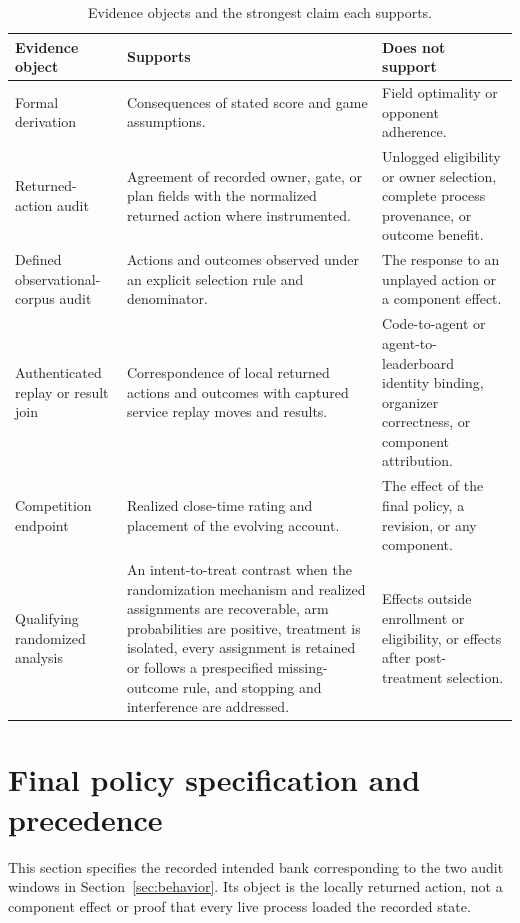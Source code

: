 \begin{table}[H]
\centering
\small
\caption{Evidence objects and the strongest claim each supports.}
\label{tab:evidence-status}
\begin{tabularx}{\linewidth}{@{}>{\raggedright\arraybackslash}p{2.85cm}YY@{}}
\toprule
Evidence object & Supports & Does not support \\
\midrule
Formal derivation & Consequences of stated score and game assumptions. & Field optimality or opponent adherence. \\
Returned-action audit & Agreement of recorded owner, gate, or plan fields with the normalized returned action where instrumented. & Unlogged eligibility or owner selection, complete process provenance, or outcome benefit. \\
Defined observational-corpus audit & Actions and outcomes observed under an explicit selection rule and denominator. & The response to an unplayed action or a component effect. \\
Authenticated replay or result join & Correspondence of local returned actions and outcomes with captured service replay moves and results. & Code-to-agent or agent-to-leaderboard identity binding, organizer correctness, or component attribution. \\
Competition endpoint & Realized close-time rating and placement of the evolving account. & The effect of the final policy, a revision, or any component. \\
Qualifying randomized analysis & An intent-to-treat contrast when the randomization mechanism and realized assignments are recoverable, arm probabilities are positive, treatment is isolated, every assignment is retained or follows a prespecified missing-outcome rule, and stopping and interference are addressed. & Effects outside enrollment or eligibility, or effects after post-treatment selection. \\
\bottomrule
\end{tabularx}
\end{table}

\FloatBarrier
\section{Final policy specification and precedence}
\label{app:policy-spec}

This section specifies the recorded intended bank corresponding to the two
audit windows in Section~\ref{sec:behavior}. Its object is the locally returned
action, not a component effect or proof that every live process loaded the
recorded state.

